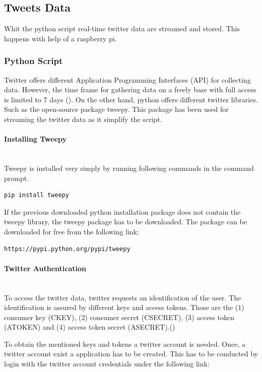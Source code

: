 \documentclass[a4paper,12pt]{article}
\begin{document}
\begin{spacing}{1.2}
\subsection{Tweets Data}
Whit the python script real-time twitter data are streamed and stored. This happens with help of a raspberry pi.
\subsubsection{Python Script}
Twitter offers different Application Programming Interfaces (API) for collecting data. However, the time frame for gathering data on a freely base with full access is limited to 7 days (\cite{twitterinc2017a}). On the other hand, python offers different twitter libraries. Such as the open-source package tweepy. This package has been used for streaming the twitter data as it simplify the script.

\paragraph{Installing Tweepy}\mbox{}\\{}
Tweepy is installed very simply by running following commands in the command prompt. 
\begin{lstlisting}[language=bash]
pip install tweepy
\end{lstlisting}

If the previous downloaded python installation package does not contain the tweepy library, the tweepy package has to be downloaded. The package can be downloaded for free from the following link:
\begin{lstlisting}[language=bash]
https://pypi.python.org/pypi/tweepy
\end{lstlisting}

\paragraph{Twitter Authentication}\mbox{}\\{}
To access the twitter data, twitter requests an identification of the user. The identification is assured by different keys and access tokens. Those are the (1) consumer key (CKEY), (2) consumer secret (CSECRET), (3) access token (ATOKEN) and (4) access token secret (ASECRET).(\cite{twitterinc2017b})

To obtain the mentioned keys and tokens a twitter account is needed. Once, a twitter account exist a application has to be created. This has to be conducted by login with the twitter account credentials under the following link: 
\begin{lstlisting}[language=bash]
%https://apps.twitter.com/
\end{lstlisting}


\end{spacing}
\end{document}
